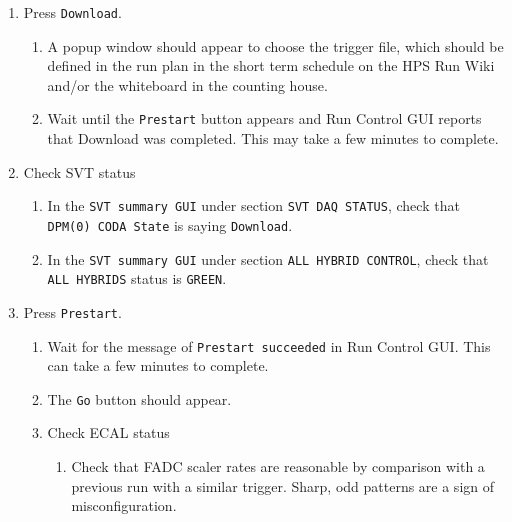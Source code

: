 \documentclass[12pt]{article}
\begin{document}
\begin{enumerate}
\item
\label{item:download}
Press \texttt{Download}.

\begin{enumerate}
\item A popup window should appear to choose the trigger file, which should be defined in the run plan in the short term schedule on the HPS Run Wiki and/or the whiteboard in the counting house.

\item Wait until the \texttt{Prestart} button appears and Run Control GUI reports that Download was completed. This may take a few minutes to complete.

\end{enumerate}

\item Check SVT status

\begin{enumerate}
\item In the \texttt{SVT summary GUI} under section \texttt{SVT DAQ STATUS}, check that \texttt{DPM(0) CODA State} is saying \texttt{Download}.
\item In the \texttt{SVT summary GUI} under section \texttt{ALL HYBRID CONTROL}, check that \texttt{ALL HYBRIDS} status is \texttt{GREEN}.
\end{enumerate}

\item
\label{item:prestart}
Press \texttt{Prestart}.

\begin{enumerate}
\item Wait for the message of \texttt{Prestart succeeded} in Run Control GUI. This can take a few minutes to complete.
\item The \texttt{Go} button should appear.

\item Check ECAL status
\begin{enumerate}
\item Check that FADC scaler rates are reasonable by comparison with a previous run with a similar trigger.  Sharp, odd patterns are a sign of misconfiguration.
\end{enumerate}


\end{enumerate}
\end{enumerate}
\end{document}
